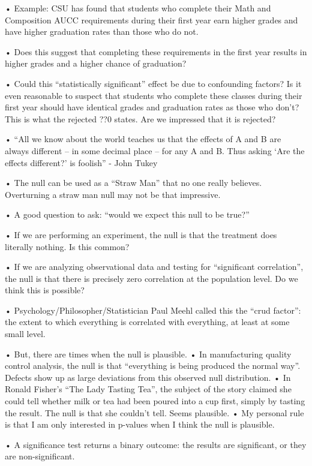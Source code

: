 \documentclass[
  letterpaper,
  DIV=11,
  numbers=noendperiod]{scrreprt}
\begin{document}
• Example: CSU has found that students who complete their Math and
Composition AUCC requirements during their first year earn higher grades
and have higher graduation rates than those who do not.

• Does this suggest that completing these requirements in the first year
results in higher grades and a higher chance of graduation?

• Could this ``statistically significant'' effect be due to confounding
factors? Is it even reasonable to suspect that students who complete
these classes during their first year should have identical grades and
graduation rates as those who don't? This is what the rejected ??0
states. Are we impressed that it is rejected?

• ``All we know about the world teaches us that the effects of A and B
are always different -- in some decimal place -- for any A and B. Thus
asking `Are the effects different?' is foolish'' - John Tukey

• The null can be used as a ``Straw Man'' that no one really believes.
Overturning a straw man null may not be that impressive.

• A good question to ask: ``would we expect this null to be true?''

• If we are performing an experiment, the null is that the treatment
does literally nothing. Is this common?

• If we are analyzing observational data and testing for ``significant
correlation'', the null is that there is precisely zero correlation at
the population level. Do we think this is possible?

• Psychology/Philosopher/Statistician Paul Meehl called this the ``crud
factor'': the extent to which everything is correlated with everything,
at least at some small level.

• But, there are times when the null is plausible. • In manufacturing
quality control analysis, the null is that ``everything is being
produced the normal way''. Defects show up as large deviations from this
observed null distribution. • In Ronald Fisher's ``The Lady Tasting
Tea'', the subject of the story claimed she could tell whether milk or
tea had been poured into a cup first, simply by tasting the result. The
null is that she couldn't tell. Seems plausible. • My personal rule is
that I am only interested in p-values when I think the null is
plausible.

• A significance test returns a binary outcome: the results are
significant, or they are non-significant.
\end{document}
